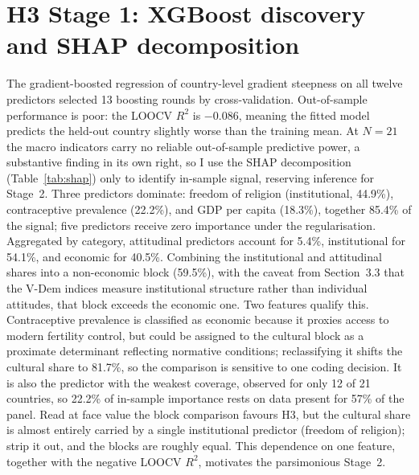\documentclass[12pt,a4paper]{report}
\begin{document}
\section{H3 Stage 1: XGBoost discovery and SHAP decomposition}
The gradient-boosted regression of country-level gradient steepness on all twelve predictors selected
13 boosting rounds by cross-validation. Out-of-sample performance is poor: the LOOCV $R^2$ is
$-0.086$, meaning the fitted model predicts the held-out country slightly worse than the training
mean. At $N=21$ the macro indicators carry no reliable out-of-sample predictive power, a substantive
finding in its own right, so I use the SHAP decomposition (Table~\ref{tab:shap}) only to identify
in-sample signal, reserving inference for Stage~2. Three predictors dominate: freedom of religion
(institutional, 44.9\%), contraceptive prevalence (22.2\%), and GDP per capita (18.3\%), together
85.4\% of the signal; five predictors receive zero importance under the regularisation. Aggregated by
category, attitudinal predictors account for 5.4\%, institutional for 54.1\%, and economic for 40.5\%.
Combining the institutional and attitudinal shares into a non-economic block (59.5\%), with the caveat
from Section~3.3 that the V-Dem indices measure institutional structure rather than individual
attitudes, that block exceeds the economic one. Two features qualify this. Contraceptive
prevalence is classified as economic because it proxies access to modern fertility
control, but could be assigned to the cultural block as a proximate
determinant reflecting normative conditions; reclassifying it shifts the cultural share to 81.7\%, so
the comparison is sensitive to one coding decision. It is also the predictor with the weakest coverage,
observed for only 12 of 21 countries, so 22.2\% of in-sample importance rests on data
present for 57\% of the panel. Read at face value the block comparison favours H3, but the cultural share is
almost entirely carried by a single institutional predictor (freedom of religion); strip it out, and the blocks are roughly equal. This
dependence on one feature, together with the negative LOOCV $R^2$, motivates the parsimonious Stage~2.
\end{document}
